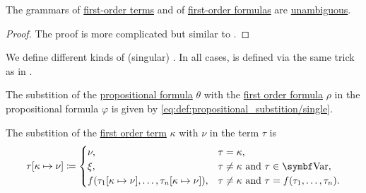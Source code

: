 \begin{proposition}\label{thm:propositional_formulas_are_unambiguous}
  The grammars of \hyperref[def:propositional_language/term]{first-order terms} and of \hyperref[def:propositional_language/formula]{first-order formulas} are \hyperref[def:grammar_derivation/ambiguity]{unambiguous}.
\end{proposition}
\begin{proof}
  The proof is more complicated but similar to .
\end{proof}

\begin{definition}\label{def:first_order_substition}
  We define different kinds of (singular) . In all cases,  is defined via the same trick as in .

  \begin{DefEnum}
     The substition of the \hyperref[def:propositional_language/formula]{propositional formula} \( \theta \) with the \hyperref[def:first_order_language/formula]{first order formula} \( \rho \) in the propositional formula \( \varphi \) is given by \eqref{eq:def:propositional_substition/single}.

     The substition of the \hyperref[def:first_order_language/term]{first order term} \( \kappa \) with \( \nu \) in the term \( \tau \) is
    \begin{equation}\label{eq:def:first_order_substition/term_in_term}
      \tau[\kappa \mapsto \nu] \coloneqq \begin{cases}
        \nu,                                                               &\tau = \kappa, \\
        \xi,                                                               &\tau \neq \kappa \Tand \tau \in \Bold{Var}, \\
        f(\tau_1[\kappa \mapsto \nu], \ldots, \tau_n[\kappa \mapsto \nu]), &\tau \neq \kappa \Tand \tau = f(\tau_1, \ldots, \tau_n).
      \end{cases}
    \end{equation}


\end{DefEnum}
\end{definition}
